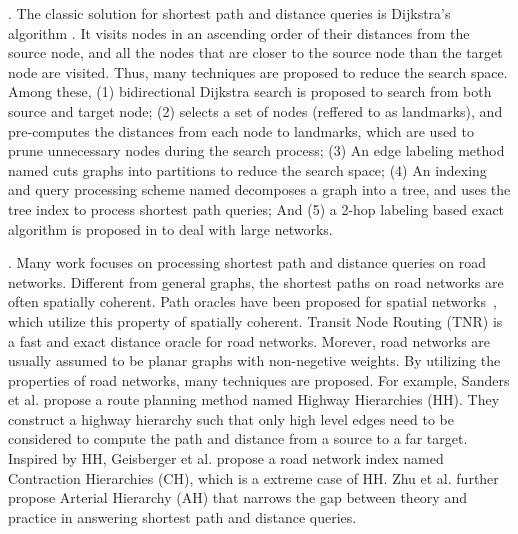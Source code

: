 .
The classic solution for shortest path and distance queries is Dijkstra's algorithm \cite{Dijkstra59}. It visits nodes in an ascending order of their distances from the source node, and all the nodes that are closer to the source node than the target node are visited. Thus, many techniques are proposed to reduce the search space. Among these, (1) bidirectional Dijkstra search \cite{LubyR89} is proposed to search from both source and target node; (2) \alt \cite{GoldbergH05} selects a set of nodes (reffered to as landmarks), and pre-computes the distances from each node to landmarks, which are used to prune unnecessary nodes during the search process; (3) An edge labeling method named \arcflag \cite{MohringSSWW05} cuts graphs into partitions to reduce the search space;
(4) An indexing and query processing scheme named \tedi \cite{Wei10} decomposes a graph into a tree, and uses the tree index to process shortest path queries; And (5) a 2-hop labeling based exact algorithm is proposed in \cite{delling2014robust} to deal with large networks.





.
Many work focuses on processing shortest path and distance queries on road networks. Different from general graphs, the shortest paths on road networks are often spatially coherent. Path oracles have been proposed for spatial networks~\cite{SankaranarayananSA09}, which utilize this property of spatially coherent. Transit Node Routing (TNR)\cite{arz2013transit} is a fast and exact distance oracle for road networks. Morever, road networks are usually assumed to be planar graphs with non-negetive weights\cite{fakcharoenphol2006planar,gupta2004roads,klein2010shortest,MozesS12}. By utilizing the properties of road networks, many techniques\cite{SandersS05, GeisbergerSSD08, zhu2013shortest} are proposed. For example, Sanders et al. propose a route planning method named Highway Hierarchies (HH)\cite{SandersS05}. They construct a highway hierarchy such that only high level edges need to be considered to compute the path and distance from a source to a far target. Inspired by HH, Geisberger et al.\cite{GeisbergerSSD08} propose a road network index named Contraction Hierarchies (CH), which is a extreme case of HH. Zhu et al. further propose Arterial Hierarchy (AH)\cite{zhu2013shortest} that narrows the gap between theory and practice in answering shortest path and distance queries.

